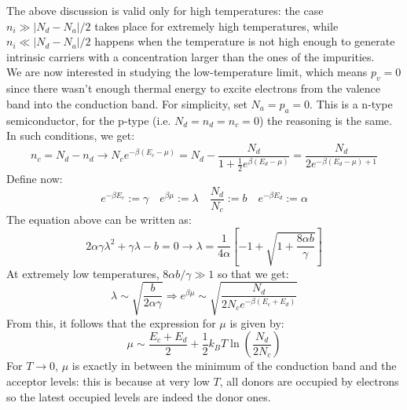 \documentclass[10.75pt,a4paper,openright,bottom=2cm]{article}
\begin{document}
The above discussion is valid only for high temperatures: the case $n_i\gg|N_d-N_a|/2$ takes place for extremely high temperatures, while $n_i\ll|N_d-N_a|/2$ happens when the temperature is not high enough to generate intrinsic carriers with a concentration larger than the ones of the impurities.\\
We are now interested in studying the low-temperature limit, which means $p_v=0$ since there wasn't enough thermal energy to excite electrons from the valence band into the conduction band. For simplicity, set $N_a=p_a=0$. This is a n-type semiconductor, for the p-type (i.e. $N_d=n_d=n_c=0$) the reasoning is the same. In such conditions, we get:
\[
n_c=N_d-n_d\to N_ce^{-\beta(E_c-\mu)}=N_d-\frac{N_d}{1+\frac{1}{2}e^{\beta(E_d-\mu)}}=\frac{N_d}{2e^{-\beta(E_d-\mu)+1}}
\]
Define now:
\[
e^{-\beta E_c}:=\gamma \quad e^{\beta\mu}:=\lambda \quad \frac{N_d}{N_c}:=b \quad e^{-\beta E_d}:=\alpha
\]
The equation above can be written as:
\[
2\alpha\gamma\lambda^2+\gamma\lambda-b=0\to\lambda=\frac{1}{4\alpha}\left[-1+\sqrt{1+\frac{8\alpha b}{\gamma}}\right]
\]
At extremely low temperatures, $8\alpha b/\gamma\gg1$ so that we get:
\[
\lambda\sim\sqrt{\frac{b}{2\alpha\gamma}}\Rightarrow e^{\beta\mu}\sim\sqrt{\frac{N_d}{2N_ce^{-\beta(E_c+E_d)}}}
\]
From this, it follows that the expression for $\mu$ is given by:
\[
\mu\sim\frac{E_c+E_d}{2}+\frac{1}{2}k_BT\ln\left(\frac{N_d}{2N_c}\right)
\]
For $T\to0$, $\mu$ is exactly in between the minimum of the conduction band and the acceptor levels: this is because at very low $T$, all donors are occupied by electrons so the latest occupied levels are indeed the donor ones.
\end{document}
